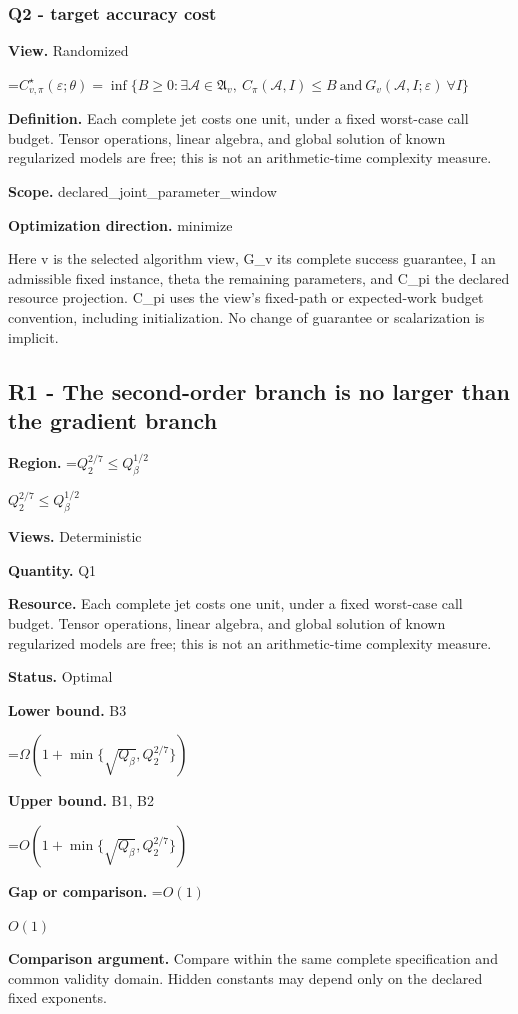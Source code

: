 \documentclass[10pt,a4paper]{article}
\newcommand{\AtlasMath}[1]{\par\begingroup\centering\setbox0=\hbox{$\displaystyle #1$}\ifdim\wd0>1.4\linewidth\typeout{ATLAS WIDE FORMULA: \the\wd0}\fi\ifdim\wd0>\linewidth\resizebox{\linewidth}{!}{\box0}\else\box0\fi\par\endgroup}
\newcommand{\AtlasInlineMath}[1]{\begingroup\setbox0=\hbox{$#1$}\ifdim\wd0>.4\linewidth\endgroup\AtlasMath{#1}\else\endgroup$#1$\fi}
\begin{document}
\subsubsection{Q2 - target accuracy cost}
\textbf{View.} Randomized

\AtlasMath{C^\star_{v,\pi}(\varepsilon;\theta)=\inf\{B\ge0:\exists\mathcal A\in\mathfrak A_v,\ C_\pi(\mathcal A,I)\le B\ \text{and}\ G_v(\mathcal A,I;\varepsilon)\ \forall I\}}
\textbf{Definition.} Each complete jet costs one unit, under a fixed worst-case call budget. Tensor operations, linear algebra, and global solution of known regularized models are free; this is not an arithmetic-time complexity measure.

\textbf{Scope.} declared\_joint\_parameter\_window

\textbf{Optimization direction.} minimize

Here v is the selected algorithm view, G\_v its complete success guarantee, I an admissible fixed instance, theta the remaining parameters, and C\_pi the declared resource projection. C\_pi uses the view's fixed-path or expected-work budget convention, including initialization. No change of guarantee or scalarization is implicit.

\subsection{R1 - The second-order branch is no larger than the gradient branch}
\textbf{Region.} \AtlasInlineMath{Q_2^{2/7}\le Q_\beta^{1/2}}

\textbf{Views.} Deterministic

\textbf{Quantity.} Q1

\textbf{Resource.} Each complete jet costs one unit, under a fixed worst-case call budget. Tensor operations, linear algebra, and global solution of known regularized models are free; this is not an arithmetic-time complexity measure.

\textbf{Status.} Optimal

\textbf{Lower bound.} B3

\AtlasMath{\Omega(1+\min\{\sqrt{Q_\beta},Q_2^{2/7}\})}
\textbf{Upper bound.} B1, B2

\AtlasMath{O(1+\min\{\sqrt{Q_\beta},Q_2^{2/7}\})}
\textbf{Gap or comparison.} \AtlasInlineMath{O(1)}

\textbf{Comparison argument.} Compare within the same complete specification and common validity domain. Hidden constants may depend only on the declared fixed exponents.
\end{document}
